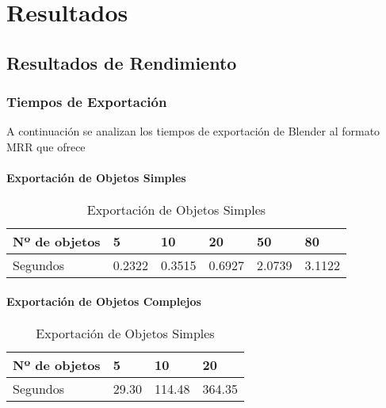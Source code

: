 
\chapter{Resultados} %

\label{Chapter4} %


\section{Resultados de Rendimiento}

\subsection{Tiempos de Exportación}
A continuación se analizan los tiempos de exportación de Blender al formato MRR que ofrece \studio

\subsubsection{Exportación de Objetos Simples}
\begin{table}[h!]
\centering
\begin{tabular}{|l|l|l|l|l|l|}
\hline
Nº de objetos & 5  & 10 & 20 & 50 & 80 \\ \hline
Segundos           & 0.2322 & 0.3515 & 0.6927 & 2.0739 & 3.1122 \\ \hline
\end{tabular}
\caption[Exportación de Objetos Simples]{Exportación de Objetos Simples}
\label{ll:expsimple}
\end{table}

\subsubsection{Exportación de Objetos Complejos}
\begin{table}[h!]
\centering
\begin{tabular}{|l|l|l|l|}
\hline
Nº de objetos & 5  & 10 & 20 \\ \hline
Segundos           & 29.30 & 114.48 & 364.35 \\ \hline
\end{tabular}
\caption[Exportación de Objetos Simples]{Exportación de Objetos Simples}
\label{ll:expsimple}
\end{table}

